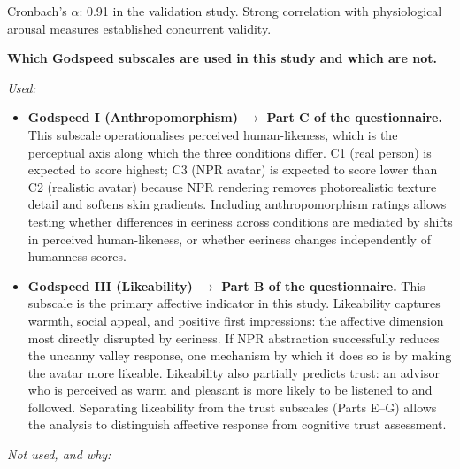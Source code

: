 \documentclass[11pt, a4paper]{article}
\begin{document}
\noindent Cronbach's $\alpha$: 0.91 in the validation study. Strong correlation with physiological arousal measures established concurrent validity.

\bigskip
\noindent\textbf{Which Godspeed subscales are used in this study and which are not.}

\medskip
\noindent\textit{Used:}

\begin{itemize}
  \item \textbf{Godspeed I (Anthropomorphism) $\to$ Part C of the questionnaire.} This subscale operationalises perceived human-likeness, which is the perceptual axis along which the three conditions differ. C1 (real person) is expected to score highest; C3 (NPR avatar) is expected to score lower than C2 (realistic avatar) because NPR rendering removes photorealistic texture detail and softens skin gradients. Including anthropomorphism ratings allows testing whether differences in eeriness across conditions are mediated by shifts in perceived human-likeness, or whether eeriness changes independently of humanness scores.

  \item \textbf{Godspeed III (Likeability) $\to$ Part B of the questionnaire.} This subscale is the primary affective indicator in this study. Likeability captures warmth, social appeal, and positive first impressions: the affective dimension most directly disrupted by eeriness. If NPR abstraction successfully reduces the uncanny valley response, one mechanism by which it does so is by making the avatar more likeable. Likeability also partially predicts trust: an advisor who is perceived as warm and pleasant is more likely to be listened to and followed. Separating likeability from the trust subscales (Parts E--G) allows the analysis to distinguish affective response from cognitive trust assessment.
\end{itemize}

\medskip
\noindent\textit{Not used, and why:}
\end{document}
